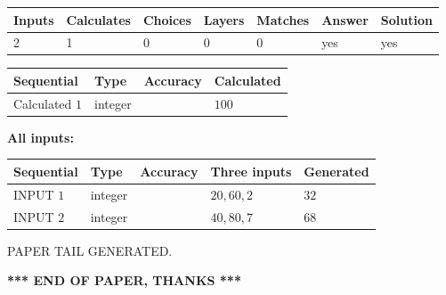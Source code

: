 \documentclass[12pt]{article}
\begin{document}
   
   
   
\noindent\begin{tabular}{|l|l|l|l|l|l|l|}
 \hline
Inputs & Calculates & Choices & Layers & Matches & Answer & Solution \\ \hline
 2  & 
 1  & 
 0
  & 
 0  & 
 0  & 
  yes & 
  yes 
  \\ \hline
 \end{tabular}
   
   
   
   
\noindent{}
   
   
  
  
\noindent\begin{tabular}{|l|l|l|l|}
\hline
 Sequential & Type & Accuracy & Calculated \\ 
\hline
 
 
  Calculated $  1 $ & integer &  & 
  $ 100 $ 
 \\  \hline  
 \end{tabular}
   
   
   
   
\noindent\vspace{0.1in}\hspace{-0.08in} {\textbf{\Large{All inputs: }}}
   
   
  
  
\noindent\begin{tabular}{|l|l|l|l|l|}
\hline
 Sequential & Type & Accuracy & Three inputs & Generated \\ 
\hline
 
 
  INPUT $  1 $ & integer &  & $
 20
 , 
 60
 , 
 2
 $ & $ 32 $ 
 \\  \hline  
 
 
  INPUT $  2 $ & integer &  & $
 40
 , 
 80
 , 
 7
 $ & $ 68 $ 
 \\  \hline  
 \end{tabular}
   
   
   
   
   
   
 \vspace{0.2in}
 
   
   
\vspace{2.0in} PAPER TAIL GENERATED.
   
   
   
   
\vspace{1.0in} 
{\textbf{\large{ *** END OF PAPER, THANKS *** }}} 
   
\end{document}
